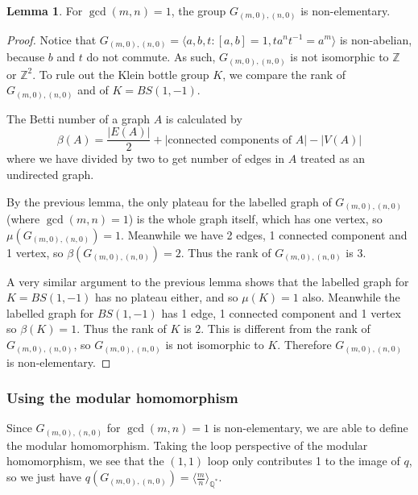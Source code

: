 \documentclass[10pt]{article}
\def\integers{{\mathbb{Z}}}
\def\rationals{{\mathbb Q}}
\theoremstyle{definition}
\newtheorem{lemma}{Lemma}
\begin{document}
\begin{lemma}\label{non-elementary}
    For $\gcd(m,n)=1$, the group $G_{(m,0),(n,0)}$ is non-elementary. 
\end{lemma}
\begin{proof}

Notice that $G_{(m,0),(n,0)} = \langle a,b,t: [a,b]=1, ta^n t^{-1} = a^m\rangle$ is non-abelian, because $b$ and $t$ do not commute. As such, $G_{(m,0),(n,0)}$ is not isomorphic to $\integers$ or $\integers^2$. To rule out the Klein bottle group $K$, we compare the rank of $G_{(m,0),(n,0)}$ and of $K = BS(1,-1)$. 

The Betti number of a graph $A$ is calculated by  $$\beta(A) = \frac{|E(A)|}{2} + |\text{connected components of }A| - |V(A)|$$ where we have divided by two to get number of edges in $A$ treated as an undirected graph. 

By the previous lemma, the only plateau for the labelled graph of $G_{(m,0),(n,0)}$ (where $\gcd(m,n)=1$) is the whole graph itself, which has one vertex, so $\mu(G_{(m,0),(n,0)})=1$. Meanwhile we have 2 edges, 1 connected component and 1 vertex, so $\beta(G_{(m,0),(n,0)}) =2$. Thus the rank of $G_{(m,0),(n,0)}$ is $3$. 

A very similar argument to the previous lemma shows that the labelled graph for $K=BS(1,-1)$ has no plateau either, and so $\mu(K)=1$ also. Meanwhile the labelled graph for $BS(1,-1)$ has 1 edge, 1 connected component and 1 vertex so $\beta(K) = 1$. Thus the rank of $K$ is $2$. This is different from the rank of $G_{(m,0),(n,0)}$, so $G_{(m,0),(n,0)}$ is not isomorphic to $K$. 
Therefore $G_{(m,0),(n,0)}$ is non-elementary. 
\end{proof}


\subsubsection{Using the modular homomorphism}

Since $G_{(m,0),(n,0)}$ for $\gcd(m,n)=1$ is non-elementary, we are able to define the modular homomorphism. Taking the loop perspective of the modular homomorphism, we see that the $(1,1)$ loop only contributes 1 to the image of $q$, so we just have $q(G_{(m,0),(n,0)}) = \langle \frac{m}{n} \rangle_{\rationals^*}$.  
\begin{center}
\end{center}
\end{document}
